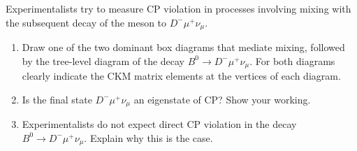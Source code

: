 Experimentalists try to measure CP violation in processes involving
 mixing with the subsequent decay of the  meson to
$D^-\mu^+\nu_{\mu}$.
\begin{enumerate}
\item Draw one of the two dominant box diagrams that mediate
   mixing, followed by the tree-level diagram of the decay  $B^0\to
  D^-\mu^+\nu_{\mu}$. For both diagrams clearly indicate the CKM matrix elements
  at the vertices of each diagram.
\item Is the final state $D^-\mu^+\nu_{\mu}$ an eigenstate of CP?  Show your working.
\item Experimentalists do not expect direct CP violation
  in the decay  $B^0\to  D^-\mu^+\nu_{\mu}$. Explain why this is the case.

\end{enumerate}
